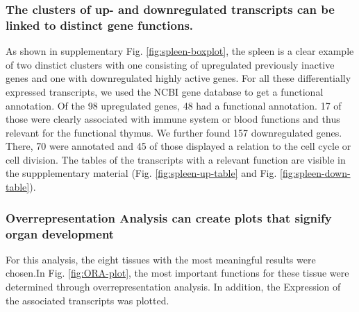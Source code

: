 \documentclass[
]{article}
\begin{document}
\hypertarget{organ-tables}{%
\subsubsection{The clusters of up- and downregulated transcripts can be linked to distinct gene functions.}\label{organ-tables}}

As shown in supplementary Fig. \ref{fig:spleen-boxplot}, the spleen is a clear example of two dinstict clusters with one consisting of upregulated previously inactive genes and one with downregulated highly active genes. For all these differentially expressed transcripts, we used the NCBI gene database to get a functional annotation. Of the 98 upregulated genes, 48 had a functional annotation. 17 of those were clearly associated with immune system or blood functions and thus relevant for the functional thymus. We further found 157 downregulated genes. There, 70 were annotated and 45 of those displayed a relation to the cell cycle or cell division. The tables of the transcripts with a relevant function are visible in the suppplementary material (Fig. \ref{fig:spleen-up-table} and Fig. \ref{fig:spleen-down-table}).

\hypertarget{organ-ora}{%
\subsubsection{Overrepresentation Analysis can create plots that signify organ development}\label{organ-ora}}

For this analysis, the eight tissues with the most meaningful results were chosen.In Fig. \ref{fig:ORA-plot}, the most important functions for these tissue were determined through overrepresentation analysis. In addition, the Expression of the associated transcripts was plotted.
\end{document}

